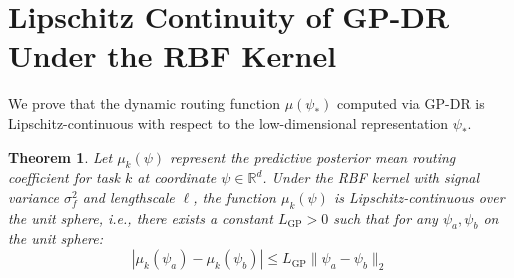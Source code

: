 \documentclass{article}
\theoremstyle{plain}
\newtheorem{theorem}{Theorem}[section]
\theoremstyle{definition}
\theoremstyle{remark}
\begin{document}
\section{Lipschitz Continuity of GP-DR Under the RBF Kernel}
\label{app:lipschitz}

We prove that the dynamic routing function $\mu(\psi_*)$ computed via GP-DR is Lipschitz-continuous with respect to the low-dimensional representation $\psi_*$.

\begin{theorem}
Let $\mu_k(\psi)$ represent the predictive posterior mean routing coefficient for task $k$ at coordinate $\psi \in \mathbb{R}^d$. Under the RBF kernel with signal variance $\sigma_f^2$ and lengthscale $\ell$, the function $\mu_k(\psi)$ is Lipschitz-continuous over the unit sphere, i.e., there exists a constant $L_{\text{GP}} > 0$ such that for any $\psi_a, \psi_b$ on the unit sphere:
\begin{equation}
|\mu_k(\psi_a) - \mu_k(\psi_b)| \le L_{\text{GP}} \|\psi_a - \psi_b\|_2
\end{equation}
\end{theorem}
\end{document}
